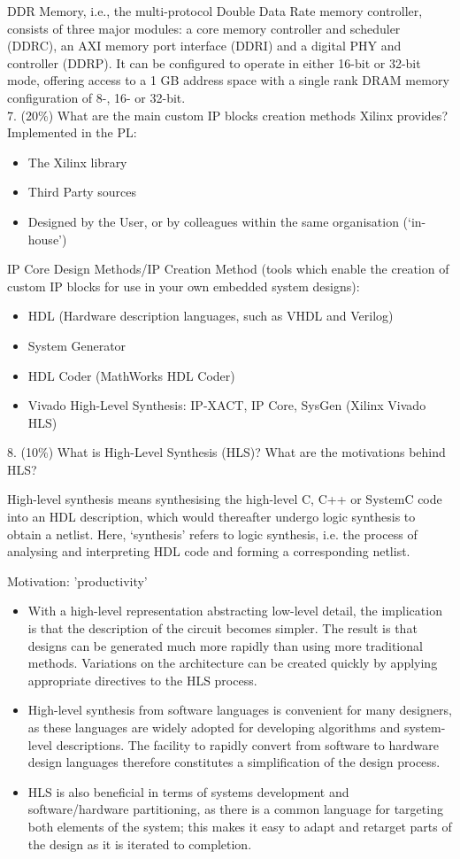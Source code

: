 \documentclass[a4paper]{article}
\begin{document}
DDR Memory, i.e., the multi-protocol Double Data Rate memory controller, consists of three major modules: a core memory controller and scheduler (DDRC), an AXI memory port interface (DDRI) and a digital PHY and controller (DDRP). It can be configured to operate in either 16-bit or 32-bit mode, offering access to a 1 GB address space with a single rank DRAM memory configuration of 8-, 16- or 32-bit.\\
7. (20\%) What are the main custom IP blocks creation methods Xilinx provides?
Implemented in the PL:
\begin{itemize}
    \item The Xilinx library
    \item Third Party sources
    \item Designed by the User, or by colleagues within the same organisation (‘in-house’)
\end{itemize}
IP Core Design Methods/IP Creation Method (tools which enable the creation of custom IP blocks for use in your own embedded system designs):
\begin{itemize}
    \item HDL (Hardware description languages, such as VHDL and Verilog)
    \item System Generator
    \item HDL Coder (MathWorks HDL Coder)
    \item Vivado High-Level Synthesis: IP-XACT, IP Core, SysGen (Xilinx Vivado HLS)
\end{itemize}
8. (10\%) What is High-Level Synthesis (HLS)? What are the motivations behind HLS?

High-level synthesis means synthesising the high-level C, C++ or SystemC code into an HDL description, which would thereafter undergo logic synthesis to obtain a netlist. Here, ‘synthesis’ refers to logic synthesis, i.e. the process of analysing and interpreting HDL code and forming a corresponding netlist.

Motivation: 'productivity'
\begin{itemize}
    \item With a high-level representation abstracting low-level detail, the implication is that the description of the circuit becomes simpler. The result is that designs can be generated much more rapidly than using more traditional methods. Variations on the architecture can be created quickly by applying appropriate directives to the HLS process.
    \item High-level synthesis from software languages is convenient for many designers, as these languages are widely adopted for developing algorithms and system-level descriptions. The facility to rapidly convert from software to hardware design languages therefore constitutes a simplification of the design process.
    \item HLS is also beneficial in terms of systems development and software/hardware partitioning, as there is a common language for targeting both elements of the system; this makes it easy to adapt and retarget parts of the design as it is iterated to completion.
\end{itemize}
\end{document}
